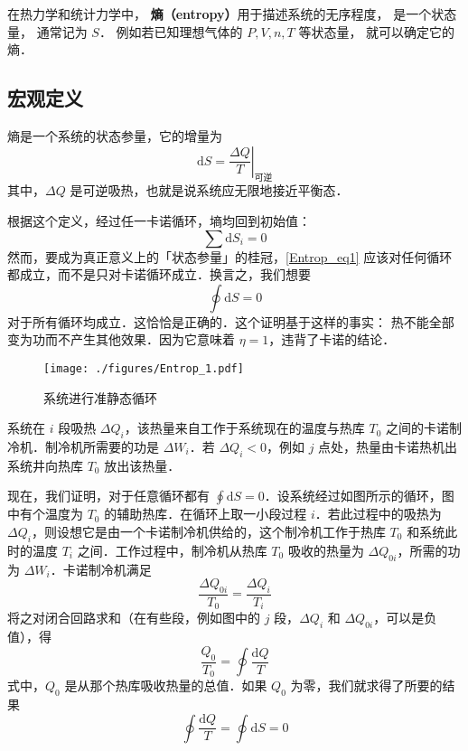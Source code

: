 
在热力学和统计力学中， \textbf{熵（entropy）}用于描述系统的无序程度， 是一个状态量， 通常记为 $S$． 例如若已知理想气体的 $P, V, n, T$ 等状态量， 就可以确定它的熵． %

\subsection{宏观定义}

熵是一个系统的状态参量，它的增量为
\begin{equation}
\mathrm{d} S = \left . \frac{\Delta Q}{T}\right |_{\text{可逆}}
\end{equation}
其中，$\Delta Q$ 是可逆吸热，也就是说系统应无限地接近平衡态．

根据这个定义，经过任一卡诺循环，墒均回到初始值：
\begin{equation} \label{Entrop_eq1}
\sum{\text{d}S_i=0}
\end{equation}
然而，要成为真正意义上的「状态参量」的桂冠，\autoref{Entrop_eq1} 应该对任何循环都成立，而不是只对卡诺循环成立．换言之，我们想要
\begin{equation}
\oint \mathrm d S =0
\end{equation}
对于所有循环均成立．这恰恰是正确的．这个证明基于这样的事实： 热不能全部变为功而不产生其他效果．因为它意味着 $\eta=1$，违背了卡诺的结论．

\begin{figure}[ht]
\centering
\texttt{[image: ./figures/Entrop\_1.pdf]}
\caption{系统进行准静态循环} \label{Entrop_fig1}
\end{figure}

系统在 $i$ 段吸热 $\Delta Q_i$，该热量来自工作于系统现在的温度与热库 $T_0$ 之间的卡诺制冷机．制冷机所需要的功是 $\Delta W_i$．若 $\Delta Q_i<0$，例如 $j$ 点处，热量由卡诺热机出系统井向热库 $T_0$ 放出该热量．

现在，我们证明，对于任意循环都有 $\oint \mathrm d S =0 $．设系统经过如图所示的循环，图中有个温度为 $T_0$ 的辅助热库．在循环上取一小段过程 $i$．若此过程中的吸热为 $\Delta Q_i$，则设想它是由一个卡诺制冷机供给的，这个制冷机工作于热库 $T_0$ 和系统此时的温度 $T_i$ 之间．工作过程中，制冷机从热库 $T_0$ 吸收的热量为 $\Delta Q_{0i}$，所需的功为 $\Delta W_i$．卡诺制冷机满足
\begin{equation}
\frac{\Delta Q_{0i}}{T_0}=\frac{\Delta Q_i}{T_i}
\end{equation}
将之对闭合回路求和（在有些段，例如图中的 $j$ 段，$\Delta Q_i$ 和 $\Delta Q_{0i}$，可以是负值），得
\begin{equation}
\frac{Q_0}{T_0}=\oint{\frac{\text{d}Q}{T}}
\end{equation}
式中，$Q_0$ 是从那个热库吸收热量的总值．如果 $Q_0$ 为零，我们就求得了所要的结果
\begin{equation}
\oint{\frac{\text{d}Q}{T}=\oint{\text{d}S=0}}
\end{equation}

